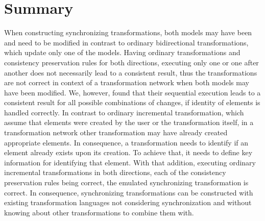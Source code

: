 \section{Summary}

\begin{insight}[Synchronization]
    When constructing synchronizing transformations, both models may have been and need to be modified in contrast to ordinary bidirectional transformations, which update only one of the models.
    Having ordinary transformations and consistency preservation rules for both directions, executing only one or one after another does not necessarily lead to a consistent result, thus the transformations are not correct in context of a transformation network when both models may have been modified.
    We, however, found that their sequential execution leads to a consistent result for all possible combinations of changes, if identity of elements is handled correctly.
    In contrast to ordinary incremental transformation, which assume that elements were created by the user or the transformation itself, in a transformation network other transformation may have already created appropriate elements.
    In consequence, a transformation needs to identify if an element already exists upon its creation.
    To achieve that, it needs to define key information for identifying that element.
    With that addition, executing ordinary incremental transformations in both directions, each of the consistency preservation rules being correct, the emulated synchronizing transformation is correct.
    In consequence, synchronizing transformations can be constructed with existing transformation languages not considering synchronization and without knowing about other transformations to combine them with.
\end{insight}

